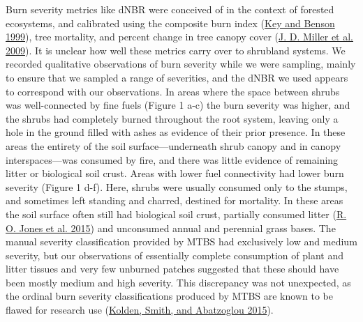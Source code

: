 \documentclass[
  12pt,
]{article}
\begin{document}
Burn severity metrics like dNBR were conceived of in the context of
forested ecosystems, and calibrated using the composite burn index
(\protect\hyperlink{ref-Key1999}{Key and Benson 1999}), tree mortality,
and percent change in tree canopy cover
(\protect\hyperlink{ref-Miller2009}{J. D. Miller et al. 2009}). It is
unclear how well these metrics carry over to shrubland systems. We
recorded qualitative observations of burn severity while we were
sampling, mainly to ensure that we sampled a range of severities, and
the dNBR we used appears to correspond with our observations. In areas
where the space between shrubs was well-connected by fine fuels (Figure
1 a-c) the burn severity was higher, and the shrubs had completely
burned throughout the root system, leaving only a hole in the ground
filled with ashes as evidence of their prior presence. In these areas
the entirety of the soil surface---underneath shrub canopy and in canopy
interspaces---was consumed by fire, and there was little evidence of
remaining litter or biological soil crust. Areas with lower fuel
connectivity had lower burn severity (Figure 1 d-f). Here, shrubs were
usually consumed only to the stumps, and sometimes left standing and
charred, destined for mortality. In these areas the soil surface often
still had biological soil crust, partially consumed litter
(\protect\hyperlink{ref-Jones2015}{R. O. Jones et al. 2015}) and
unconsumed annual and perennial grass bases. The manual severity
classification provided by MTBS had exclusively low and medium severity,
but our observations of essentially complete consumption of plant and
litter tissues and very few unburned patches suggested that these should
have been mostly medium and high severity. This discrepancy was not
unexpected, as the ordinal burn severity classifications produced by
MTBS are known to be flawed for research use
(\protect\hyperlink{ref-Kolden2015}{Kolden, Smith, and Abatzoglou
2015}).
\end{document}
